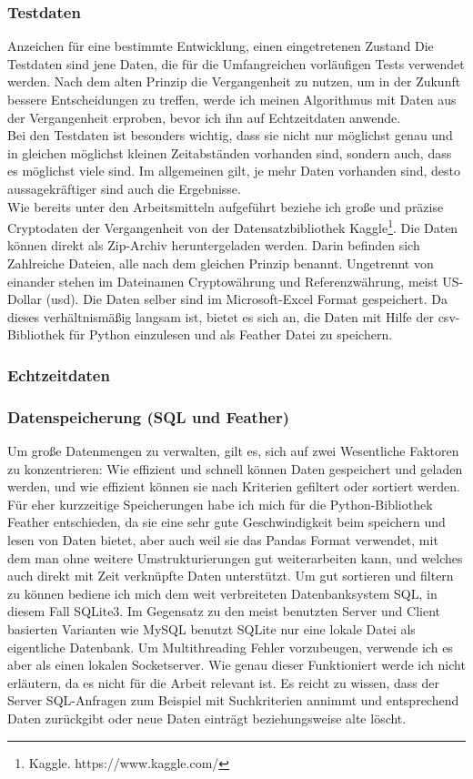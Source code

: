 \documentclass[12pt]{article}
\begin{document}
	\subsubsection{Testdaten}
		Anzeichen für eine bestimmte Entwicklung, einen eingetretenen Zustand
		Die Testdaten sind jene Daten, die für die Umfangreichen vorläufigen Tests verwendet werden. Nach dem alten Prinzip die Vergangenheit zu nutzen, um in der Zukunft bessere Entscheidungen zu treffen, werde ich meinen Algorithmus mit Daten aus der Vergangenheit erproben, bevor ich ihn auf Echtzeitdaten anwende.\\
		Bei den Testdaten ist besonders wichtig, dass sie nicht nur möglichst genau und in gleichen möglichst kleinen Zeitabständen vorhanden sind, sondern auch, dass es möglichst viele sind. Im allgemeinen gilt, je mehr Daten vorhanden sind, desto aussagekräftiger sind auch die Ergebnisse.\\
		Wie bereits unter den Arbeitsmitteln aufgeführt beziehe ich große und präzise Cryptodaten der Vergangenheit von der Datensatzbibliothek Kaggle\footnote{Kaggle. https://www.kaggle.com/}. Die Daten können direkt als Zip-Archiv heruntergeladen werden. Darin befinden sich Zahlreiche Dateien, alle nach dem gleichen Prinzip benannt. Ungetrennt von einander stehen im Dateinamen Cryptowährung und Referenzwährung, meist US-Dollar (usd). Die Daten selber sind im Microsoft-Excel Format gespeichert. Da dieses verhältnismäßig langsam ist, bietet es sich an, die Daten mit Hilfe der csv-Bibliothek für Python einzulesen und als Feather Datei zu speichern. 
	\subsubsection{Echtzeitdaten}
	\subsubsection{Datenspeicherung (SQL und Feather)}
		Um große Datenmengen zu verwalten, gilt es, sich auf zwei Wesentliche Faktoren zu konzentrieren: Wie effizient und schnell können Daten gespeichert und geladen werden, und wie effizient können sie nach Kriterien gefiltert oder sortiert werden. Für eher kurzzeitige Speicherungen habe ich mich für die Python-Bibliothek Feather entschieden, da sie eine sehr gute Geschwindigkeit beim speichern und lesen von Daten bietet, aber auch weil sie das Pandas Format verwendet, mit dem man ohne weitere Umstrukturierungen gut weiterarbeiten kann, und welches auch direkt mit Zeit verknüpfte Daten unterstützt. Um gut sortieren und filtern zu können bediene ich mich dem weit verbreiteten Datenbanksystem SQL, in diesem Fall SQLite3. Im Gegensatz zu den meist benutzten Server und Client basierten Varianten wie MySQL benutzt SQLite nur eine lokale Datei als eigentliche Datenbank. Um Multithreading Fehler vorzubeugen, verwende ich es aber als einen lokalen Socketserver. Wie genau dieser Funktioniert werde ich nicht erläutern, da es nicht für die Arbeit relevant ist. Es reicht zu wissen, dass der Server SQL-Anfragen zum Beispiel mit Suchkriterien annimmt und entsprechend Daten zurückgibt oder neue Daten einträgt beziehungsweise alte löscht.
\end{document}
